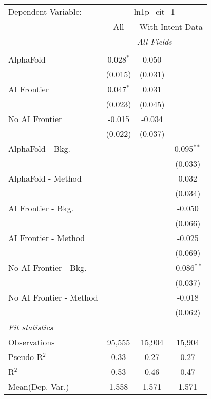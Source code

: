 \begingroup
\centering
\begin{tabular}{lccc}
   \tabularnewline \midrule \midrule
   Dependent Variable: & \multicolumn{3}{c}{ln1p\_cit\_1}\\
 & \multicolumn{1}{c}{All} & \multicolumn{2}{c}{With Intent Data} \\
\cmidrule(lr){2-2} \cmidrule(lr){3-4}
 & \multicolumn{3}{c}{\textit{All Fields}} \\ \\
   AlphaFold               & 0.028$^{*}$ & 0.050   &   \\   
                           & (0.015)     & (0.031) &   \\   
   AI Frontier             & 0.047$^{*}$ & 0.031   &   \\   
                           & (0.023)     & (0.045) &   \\   
   No AI Frontier          & -0.015      & -0.034  &   \\   
                           & (0.022)     & (0.037) &   \\   
   AlphaFold - Bkg.        &             &         & 0.095$^{**}$\\   
                           &             &         & (0.033)\\   
   AlphaFold - Method      &             &         & 0.032\\   
                           &             &         & (0.034)\\   
   AI Frontier - Bkg.      &             &         & -0.050\\   
                           &             &         & (0.066)\\   
   AI Frontier - Method    &             &         & -0.025\\   
                           &             &         & (0.069)\\   
   No AI Frontier - Bkg.   &             &         & -0.086$^{**}$\\   
                           &             &         & (0.037)\\   
   No AI Frontier - Method &             &         & -0.018\\   
                           &             &         & (0.062)\\   
   \midrule
   \emph{Fit statistics}\\
   Observations            & 95,555      & 15,904  & 15,904\\  
   Pseudo R$^2$            & 0.33        & 0.27    & 0.27\\  
   R$^2$                   & 0.53        & 0.46    & 0.47\\  
Mean(Dep. Var.) & 1.558 & 1.571 & 1.571 \\
   

\end{tabular}

